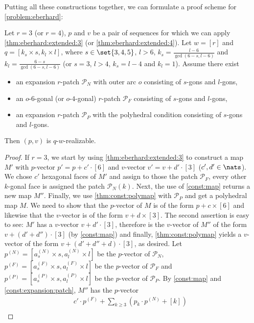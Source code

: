 Putting all these constructions together, we can formulate a proof scheme for \autoref{problem:eberhard}:
\begin{proposition} Let $r = 3$ (or $r = 4$), $p$ and $v$ be a pair of sequences for which we can apply \autoref{thm:eberhard:extended:3} (or \autoref{thm:eberhard:extended:4}). Let $w = [r]$ and $q = [k_s \times s, k_l \times l]$, where $s \in \set{3, 4, 5}$, $l > 6$, $k_s = \frac{l - 6}{\gcd(6 - s, l - 6)}$ and $k_l = \frac{6 - s}{\gcd(6 - s, l - 6)}$ (or $s = 3$, $l > 4$, $k_s = l - 4$ and $k_l = 1$). Assume there exist
  \begin{itemize}
  \item an expansion $r$-patch $\mathcal{P}_N$ with outer arc $o$ consisting of $s$-gons and $l$-gons,
  \item an $o$-$6$-gonal (or $o$-$4$-gonal) $r$-patch $\mathcal{P}_F$ consisting of $s$-gons and $l$-gons,
  \item an expansion $r$-patch $\mathcal{P}_P$ with the polyhedral condition consisting of $s$-gons and $l$-gons.
  \end{itemize}
  Then $(p, v)$ is $q$-$w$-realizable.
  \begin{proof}
    If $r = 3$, we start by using \autoref{thm:eberhard:extended:3} to construct a map $M'$ with $p$-vector $p' = p + c' \cdot [6]$ and $v$-vector $v' = v + d' \cdot [3]$ ($c', d' \in \nats$). We chose $c'$ hexagonal faces of $M'$ and assign to those the patch $\mathcal{P}_F$, every other $k$-gonal face is assigned the patch $\mathcal{P}_N(k)$. Next, the use of \autoref{const:map} returns a new map $M''$. Finally, we use \autoref{thm:const:polymap} with $\mathcal{P}_P$ and get a polyhedral map $M$. We need to show that the $p$-vector of $M$ is of the form $p + c \times [6]$ and likewise that the $v$-vector is of the form $v + d \times [3]$. The second assertion is easy to see: $M'$ has a $v$-vector $v + d' \cdot [3]$, therefore is the $v$-vector of $M''$ of the form $v + (d' + d'') \cdot [3]$ (by \autoref{const:map}) and finally, \autoref{thm:const:polymap} yields a $v$-vector of the form $v + (d' + d'' + d) \cdot [3]$, as desired. Let $p^{(N)} = [a^{(N)}_s \times s, a^{(N)}_l \times l]$ be the $p$-vector of $\mathcal{P}_N$, $p^{(F)} = [a^{(F)}_s \times s, a^{(F)}_l \times l]$ be the $p$-vector of $\mathcal{P}_F$ and $p^{(P)} = [a^{(P)}_s \times s, a^{(P)}_l \times l]$ be the $p$-vector of $\mathcal{P}_P$. By \autoref{const:map} and \autoref{const:expansion:patch}, $M''$ has the $p$-vector
    \begin{align*}
      &c' \cdot p^{(F)} + \sum_{k \geq 3} \left(p_k \cdot p^{(N)} + [k]\right)\\

\end{align*}
\end{proof}
\end{proposition}
